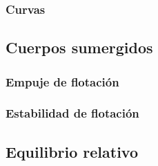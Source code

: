 \subsubsection{Curvas}

\subsection{Cuerpos sumergidos}

\subsubsection{Empuje de flotación}

\subsubsection{Estabilidad de flotación}

\subsection{Equilibrio relativo}	
